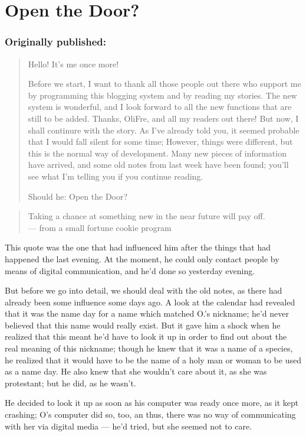 \chapter{Open the Door?}
\label{cha:open-the-door}
\subsection*{Originally published: }
\begin{quote}
Hello! It's me once more!

Before we start, I want to thank all those people out there who support me by programming this blogging system and by reading my stories. The new system is wonderful, and I look forward to all the new functions that are still to be added. Thanks, OliFre, and all my readers out there!
But now, I shall continure with the story. As I've already told you, it seemed probable that I would fall silent for some time; However, things were different, but this is the normal way of development. Many new pieces of information have arrived, and some old notes from last week have been found; you'll see what I'm telling you if you continue reading.

Should he: Open the Door?
\end{quote}

\begin{verse}
Taking a chance at something new in the near future will pay off.\\
--- from a small fortune cookie program
\end{verse}
This quote was the one that had influenced him after the things that had happened the last evening. At the moment, he could only contact people by means of digital communication, and he'd done so yesterday evening.

But before we go into detail, we should deal with the old notes, as there had already been some influence some days ago.
A look at the calendar had revealed that it was the name day for a name which matched O.'s nickname; he'd never believed that this name would really exist. But it gave him a shock when he realized that this meant he'd have to look it up in order to find out about the real meaning of this nickname; though he knew that it was a name of a species, he realized that it would have to be the name of a holy man or woman to be used as a name day.
He also knew that she wouldn't care about it, as she was protestant; but he did, as he wasn't.

He decided to look it up as soon as his computer was ready once more, as it kept crashing; O's computer did so, too, an thus, there was no way of communicating with her via digital media --- he'd tried, but she seemed not to care.


